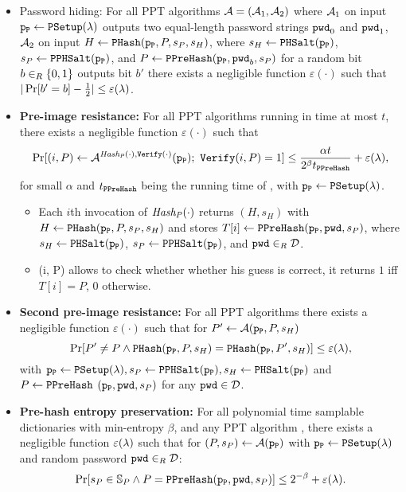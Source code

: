 \begin{itemize}
  \item Password hiding: 
    For all \ac{PPT} algorithms $\mathcal{A}=(\mathcal{A}_1,\mathcal{A}_2)$ where $\mathcal{A}_1$ on input $\mathtt{p_P}\gets\mathtt{PSetup}(\lambda)$ outputs two equal-length password strings $\mathtt{pwd}_0$ and $\mathtt{pwd}_1$, $\mathcal{A}_2$ on input $H\gets\mathtt{PHash}(\mathtt{p_P},P,s_P,s_H)$, where $s_H\gets\mathtt{PHSalt}(\mathtt{p_P})$, $s_P\gets\mathtt{PPHSalt}(\mathtt{p_P})$, and $P\gets\mathtt{PPreHash}(\mathtt{p_P},\mathtt{pwd}_b, s_P)$ for a random bit $b\in_R\{0,1\}$ outputs bit $b'$ there exists a negligible function $\varepsilon(\cdot)$ such that
$|\Pr[b'=b]-\frac12|\leq\varepsilon(\lambda)$.

  \item \textbf{Pre-image resistance:}
    For all \ac{PPT} algorithms \cA running in time at most $t$, there exists a negligible function $\varepsilon(\cdot)$ such that
    \[\Pr[(i,P)\gets \mathcal{A}^{\mathit{Hash_P}(\cdot), \mathtt{Verify}(\cdot)}(\mathtt{p_P});~ \mathtt{Verify}(i,P) = 1]\leq \frac{\alpha t}{2^\beta t_\mathtt{PPreHash}}+\varepsilon(\lambda),\]
    for small $\alpha$ and $t_\mathtt{PPreHash}$ being the running time of \PPreHash, with $\mathtt{p_P}\gets\mathtt{PSetup}(\lambda)$.
    \begin{itemize}
      \item Each $i$th invocation of $\mathit{Hash_P}(\cdot)$ returns $(H,s_H)$ with $H\gets\mathtt{PHash}(\mathtt{p_P},P,s_P,s_H)$ and stores $T[i]\gets\mathtt{PPreHash}(\mathtt{p_P},\mathtt{pwd}, s_P)$, where $s_H\gets\mathtt{PHSalt}(\mathtt{p_P})$, $s_P\gets\mathtt{PPHSalt}(\mathtt{p_P})$, and $\mathtt{pwd}\in_R\mathcal{D}$.
      \item \Verify(i, P) allows \cA to check whether whether his guess is correct, \ie it returns $1$ iff $T[i]=P$, $0$ otherwise. 
    \end{itemize}

\item \textbf{Second pre-image resistance:}
    For all \ac{PPT} algorithms \cA there exists a negligible function $\varepsilon(\cdot)$ such that for $P'\gets \mathcal{A}(\mathtt{p_P}, P, s_H)$
      \[\Pr[P'\not=P \wedge \mathtt{PHash}(\mathtt{p_P},P,s_H)=\mathtt{PHash}(\mathtt{p_P},P',s_H)] \leq \varepsilon(\lambda),\]
      with $\mathtt{p_P}\gets\mathtt{PSetup}(\lambda), s_P\gets\mathtt{PPHSalt}(\mathtt{p_P}), s_H\gets\mathtt{PHSalt}(\mathtt{p_P})$ and $P\gets\mathtt{PPreHash}$ $(\mathtt{p_P}, \mathtt{pwd}, s_P)$ for any $\mathtt{pwd}\in\mathcal{D}$.

\item \textbf{Pre-hash entropy preservation:}
    For all polynomial time samplable dictionaries \cD with min-entropy $\beta$, and any \ac{PPT} algorithm \cA, there exists a negligible function $\varepsilon(\lambda)$ such that for $(P,s_P)\gets \mathcal{A}(\mathtt{p_P})$ with $\mathtt{p_P}\gets\mathtt{PSetup}(\lambda)$ and random password $\mathtt{pwd}\in_R\mathcal{D}$:
      \[\Pr[s_P\in\mathbb{S}_P \wedge P=\mathtt{PPreHash}(\mathtt{p_P},\mathtt{pwd},s_P)] \leq 2^{-\beta} + \varepsilon(\lambda).\]


\end{itemize}
